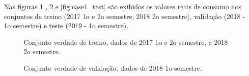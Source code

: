\documentclass[	12pt, Times, openright, twoside, a4paper, english, brazil]{abntex2}
\begin{document}
                    Nas figuras \ref{fig:case1_train} , \ref{fig:case1_val} e \ref{fig:case1_test}   são exibidos os valores reais de consumo nos conjuntos de treino (2017 1o e 2o semestre, 2018 2o semestre), validação (2018 - 1o semestre) e teste (2019 - 1o semestre).
                    \begin{figure}[!ht]
                    	\caption{Conjunto verdade de treino, dados de 2017 1o e 2o semestre, e 2018 2o semestre. \label{fig:case1_train} }
                    \end{figure}
                    \begin{figure}[!ht]
                    	\caption{Conjunto verdade de validação, dados de 2018 1o semestre. \label{fig:case1_val} }
                    \end{figure}
\end{document}
